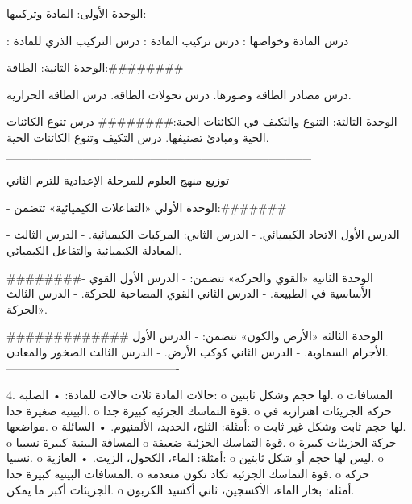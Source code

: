 الوحدة الأولى: المادة وتركيبها:

: درس المادة وخواصها
: درس تركيب المادة
: درس التركيب الذري للمادة

الوحدة الثانية: الطاقة:########

درس مصادر الطاقة وصورها.
درس تحولات الطاقة.
 درس الطاقة الحرارية.

الوحدة الثالثة: التنوع والتكيف في الكائنات الحية:########
درس تنوع الكائنات الحية ومبادئ تصنيفها.
 درس التكيف وتنوع الكائنات الحية.
____________________________________

توزيع منهج العلوم للمرحلة الإعدادية للترم الثاني

- الوحدة الأولي «التفاعلات الكيميائية» تتضمن:#######

- الدرس الأول الاتحاد الكيميائي.
- الدرس الثاني: المركبات الكيميائية.
- الدرس الثالث المعادلة الكيميائية والتفاعل الكيميائي.

########- الوحدة الثانية «القوي والحركة» تتضمن:
- الدرس الأول القوي الأساسية في الطبيعة.
- الدرس الثاني القوي المصاحبة للحركة.
- الدرس الثالث الحركة».

############# الوحدة الثالثة «الأرض والكون» تتضمن:
- الدرس الأول الأجرام السماوية.
- الدرس الثاني كوكب الأرض.
- الدرس الثالث الصخور والمعادن.
----------------------------------------------

4. حالات المادة
ثلاث حالات للمادة:
• الصلبة:
o لها حجم وشكل ثابتين.
o المسافات البينية صغيرة جدا.
o قوة التماسك الجزئية كبيرة جدا.
o حركة الجزيئات اهتزازية في مواضعها.
o أمثلة: الثلج، الحديد، الألمنيوم.
• السائلة:
o لها حجم ثابت وشكل غير ثابت.
o المسافة البينية كبيرة نسبيا
o قوة التماسك الجزئية ضعيفة.
o حركة الجزيئات كبيرة نسبيا.
o أمثلة: الماء، الكحول، الزيت.
• الغازية:
o ليس لها حجم أو شكل ثابتين.
o المسافات البينية كبيرة جدا.
o قوة التماسك الجزئية تكاد تكون منعدمة.
o حركة الجزيئات أكبر ما يمكن.
o أمثلة: بخار الماء، الأكسجين، ثاني أكسيد الكربون.